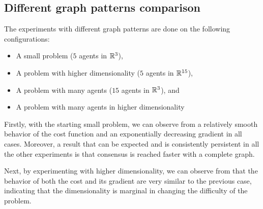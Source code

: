 \documentclass[a4paper,11pt,oneside]{book}
\begin{document}
\subsection{Different graph patterns comparison}

The experiments with different graph patterns are done on the following configurations:
\begin{itemize}
      \item A small problem ($5$ agents in ${\mathbb{R}}^3$),
      \item A problem with higher dimensionality ($5$ agents in ${\mathbb{R}}^{15}$),
      \item A problem with many agents ($15$ agents in ${\mathbb{R}}^3$), and
      \item A problem with many agents in higher dimensionality 
\end{itemize}

Firstly, with the starting small problem, we can observe from  a relatively smooth behavior of the cost function and an exponentially decreasing gradient in all cases. Moreover, a result that can be expected and is consistently persistent in all the other experiments is that consensus is reached faster with a complete graph.

Next, by experimenting with higher dimensionality, we can observe from  that the behavior of both the cost and its gradient are very similar to the previous case, indicating that the dimensionality is marginal in changing the difficulty of the problem. 
\end{document}

